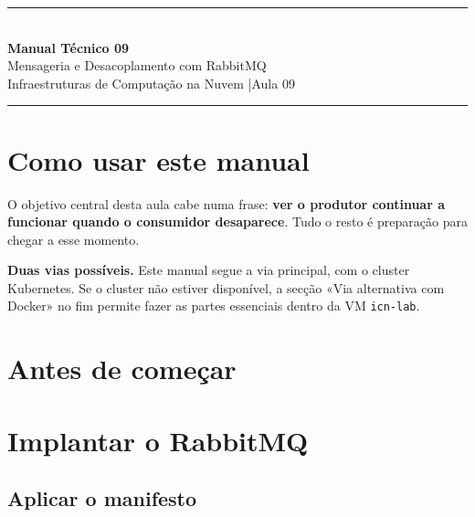 \documentclass[11pt,a4paper]{article}
\newcommand{\manualtitle}[3]{%
  \thispagestyle{empty}
  \begin{center}
  {\color{NudeTaupe}\rule{\textwidth}{0.5pt}}\\[0.5cm]
  {\LARGE\bfseries\color{TextEspresso} Manual Técnico #1}\\[0.35cm]
  {\large\color{TextEspresso} #2}\\[0.3cm]
  {\normalsize\color{NudeTaupe} Infraestruturas de Computação na Nuvem \quad|\quad #3}\\[0.4cm]
  {\color{NudeTaupe}\rule{\textwidth}{0.5pt}}
  \end{center}
  \vspace{0.4cm}
}
\begin{document}
\manualtitle{09}{Mensageria e Desacoplamento com RabbitMQ}{Aula 09}

\section*{Como usar este manual}

O objetivo central desta aula cabe numa frase: \textbf{ver o produtor continuar a funcionar quando o consumidor desaparece}. Tudo o resto é preparação para chegar a esse momento.

\begin{nota}
\textbf{Duas vias possíveis.} Este manual segue a via principal, com o cluster Kubernetes. Se o cluster não estiver disponível, a secção «Via alternativa com Docker» no fim permite fazer as partes essenciais dentro da VM \texttt{icn-lab}.
\end{nota}

\section*{Antes de começar}


\section{Implantar o RabbitMQ}

\subsection{Aplicar o manifesto}

\end{document}
